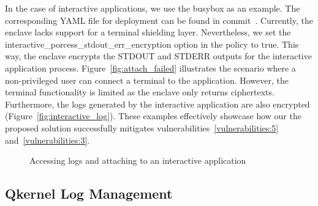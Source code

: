 In the case of interactive applications, we use the busybox as an example. The corresponding YAML file for deployment can be found in commit~\cite*{artifacts_busybox}. Currently, the enclave lacks support for a terminal shielding layer. Nevertheless, we set the interactive\_porcess\_stdout\_err\_encryption option in the policy to true. 
This way, the enclave encrypts the STDOUT and STDERR outputs for the interactive application process. Figure~\ref{fig:attach_failed} illustrates the scenario where a non-privileged user can connect a terminal to the application. However, the terminal functionality is limited as the enclave only returns ciphertexts. 
Furthermore, the logs generated by the interactive application are also encrypted (Figure~\ref{fig:interactive_log}). These examples effectively showcase how our 
the proposed solution successfully mitigates vulnerabilities~\ref{vulnerabilities:5} and~\ref{vulnerabilities:3}.


\begin{figure}[!htb]


  
    \caption[Accessing logs and attaching to an interactive application ]{Accessing logs and attaching to an interactive application }
\end{figure}



\subsection{Qkernel Log Management}

